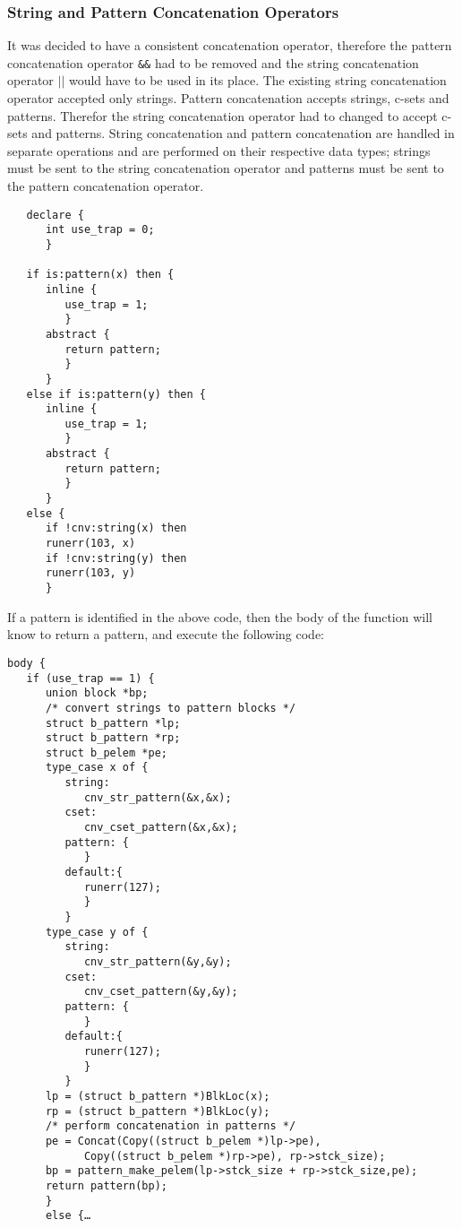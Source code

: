 \documentclass{article}
\begin{document}
\subsubsection{String and Pattern Concatenation Operators}
It was decided to have a consistent concatenation operator, therefore the pattern concatenation operator \texttt{\&\&} had to be removed and the string concatenation operator $\vert\vert$ would have to be used in its place.  The existing string concatenation operator accepted only strings.  Pattern concatenation accepts strings, c-sets and patterns.  Therefor the string concatenation operator had to changed to accept c-sets and patterns.  String concatenation and pattern concatenation are handled in separate operations and are performed on their respective data types; strings must be sent to the string concatenation operator and patterns must be sent to the pattern concatenation operator. 
\begin{verbatim}
   declare {
      int use_trap = 0;
      }

   if is:pattern(x) then {
      inline {
         use_trap = 1;
         }
      abstract {
         return pattern;
         }
      }
   else if is:pattern(y) then {
      inline {
         use_trap = 1;
         }
      abstract {
         return pattern;
         }
      }
   else {
      if !cnv:string(x) then
      runerr(103, x)
      if !cnv:string(y) then
      runerr(103, y)
      }
\end{verbatim}
If a pattern is identified in the above code, then the body of the function will know to return a pattern, and execute the following code:
\begin{verbatim}
body {
   if (use_trap == 1) {
      union block *bp;
      /* convert strings to pattern blocks */
      struct b_pattern *lp;
      struct b_pattern *rp;
      struct b_pelem *pe;
      type_case x of {
         string:
            cnv_str_pattern(&x,&x);
         cset:
            cnv_cset_pattern(&x,&x);
         pattern: {
            }
         default:{
            runerr(127);
            }
         }
      type_case y of {
         string:
            cnv_str_pattern(&y,&y);
         cset:
			cnv_cset_pattern(&y,&y);
         pattern: {
            }
         default:{
            runerr(127);
            }
         }
      lp = (struct b_pattern *)BlkLoc(x);
      rp = (struct b_pattern *)BlkLoc(y);
      /* perform concatenation in patterns */
      pe = Concat(Copy((struct b_pelem *)lp->pe), 
            Copy((struct b_pelem *)rp->pe), rp->stck_size);
      bp = pattern_make_pelem(lp->stck_size + rp->stck_size,pe);
      return pattern(bp);
      }
      else {…
\end{verbatim}
\end{document}

